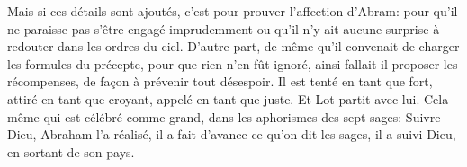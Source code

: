 Mais si ces détails sont ajoutés, c’est pour prouver l’affection d’Abram:
	pour qu’il ne paraisse pas s’être engagé imprudemment
	ou qu’il n’y ait aucune surprise à redouter dans les ordres du ciel.
D’autre part, de même qu’il convenait de charger les formules du précepte,
	pour que rien n’en fût ignoré,
	ainsi fallait-il proposer les récompenses,
	de façon à prévenir tout désespoir.
Il est tenté en tant que fort,
	attiré en tant que croyant,
	appelé en tant que juste.
Et Lot partit avec lui.
Cela même qui est célébré comme grand, dans les aphorismes des sept sages:
	Suivre Dieu,
	Abraham l’a réalisé, il a fait d’avance ce qu’on dit les sages,
	il a suivi Dieu, en sortant de son pays.

